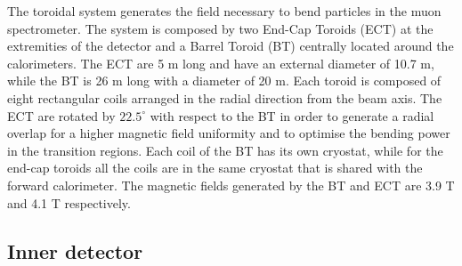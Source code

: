 The toroidal system generates the field necessary to bend particles in the muon spectrometer. The system is composed by two End-Cap Toroids (ECT) at the extremities of the detector and a Barrel Toroid (BT) centrally located around the calorimeters. The ECT are 5 m long and have an external diameter of 10.7 m, while the BT is 26 m long with a diameter of 20 m. Each toroid is composed of eight rectangular coils arranged in the radial direction from the beam axis. The ECT are rotated by $22.5^{\circ}$ with respect to the BT in order to generate a radial overlap for a higher magnetic field uniformity and to optimise the bending power in the transition regions. Each coil of the BT has its own cryostat, while for the end-cap toroids all the coils are in the same cryostat that is shared with the forward calorimeter. The magnetic fields generated by the BT and ECT are 3.9 T and 4.1 T respectively. 


\subsection{Inner detector}

